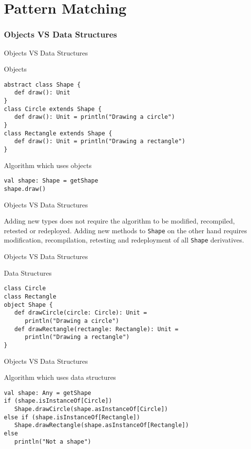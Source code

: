 \part[Pattern Matching]{Pattern Matching}
\section{Objects VS Data Structures}
\begin{frame}[fragile]{Objects VS Data Structures}
\begin{block}{Objects}
\begin{lstlisting}
abstract class Shape {
   def draw(): Unit
}
class Circle extends Shape {
   def draw(): Unit = println("Drawing a circle")
}
class Rectangle extends Shape {
   def draw(): Unit = println("Drawing a rectangle")
}   
\end{lstlisting}
\end{block}
\pause
\begin{block}{Algorithm which uses objects}
\begin{lstlisting}
val shape: Shape = getShape
shape.draw()
\end{lstlisting}
\end{block}
\end{frame}

\begin{frame}[fragile]{Objects VS Data Structures}
\begin{center}
Adding new types does not require the algorithm to be modified, recompiled,
retested or redeployed. Adding new methods to \lstinline!Shape! on the other
hand requires modification, recompilation, retesting and redeployment of
\alert{all} \lstinline!Shape! derivatives.
\end{center}
\end{frame}

\begin{frame}[fragile]{Objects VS Data Structures}
\begin{block}{Data Structures}
\begin{lstlisting}
class Circle
class Rectangle
object Shape {
   def drawCircle(circle: Circle): Unit =
      println("Drawing a circle")
   def drawRectangle(rectangle: Rectangle): Unit =
      println("Drawing a rectangle")
}
\end{lstlisting}
\end{block}
\end{frame}

\begin{frame}[fragile]{Objects VS Data Structures}
\begin{block}{Algorithm which uses data structures}
\begin{lstlisting}
val shape: Any = getShape
if (shape.isInstanceOf[Circle])
   Shape.drawCircle(shape.asInstanceOf[Circle])
else if (shape.isInstanceOf[Rectangle])
   Shape.drawRectangle(shape.asInstanceOf[Rectangle])
else 
   println("Not a shape")
\end{lstlisting}
\end{block}
\end{frame}

